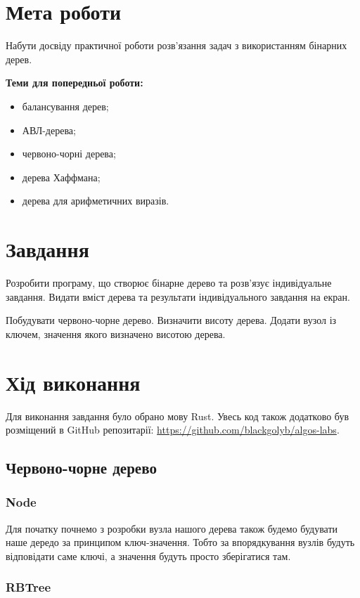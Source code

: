 \section{Мета роботи}
Набути досвіду практичної роботи розв’язання задач з використанням бінарних дерев.

\noindent
\textbf{Теми для попередньої роботи:}
\begin{itemize}
    \item балансування дерев;
    \item АВЛ-дерева;
    \item червоно-чорні дерева;
    \item дерева Хаффмана;
    \item дерева для арифметичних виразів.
\end{itemize}


\section{Завдання}
Розробити програму, що створює бінарне дерево та розв’язує
індивідуальне завдання. Видати вміст дерева та результати індивідуального
завдання на екран.

Побудувати червоно-чорне дерево. Визначити висоту дерева.
Додати вузол із ключем, значення якого визначено висотою дерева.

\section{Хід виконання}
Для виконання завдання було обрано мову Rust.
Увесь код також додатково був розміщений в GitHub репозитарії: \href{https://github.com/blackgolyb/algos-labs}{https://github.com/blackgolyb/algos-labs}.


\newpage
\subsection{Червоно-чорне дерево}
\subsubsection{Node}
Для початку почнемо з розробки вузла нашого дерева також будемо будувати наше дередо за принципом ключ-значення.
Тобто за впорядкування вузлів будуть відповідати саме ключі, а значення будуть просто зберігатися там.


\subsubsection{RBTree}



